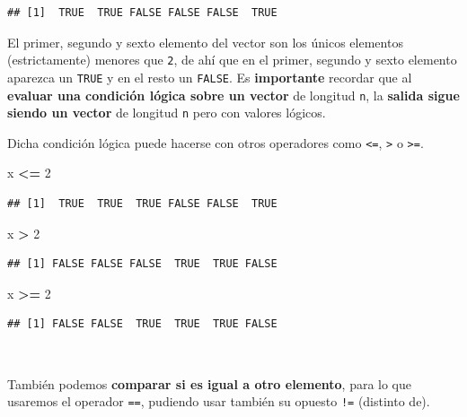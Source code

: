 \documentclass[11pt,]{book}
\newenvironment{Shaded}{\begin{snugshade}}{\end{snugshade}}
\newcommand{\DecValTok}[1]{\textcolor[rgb]{0.06,0.06,0.06}{#1}}
\newcommand{\NormalTok}[1]{#1}
\newcommand{\OperatorTok}[1]{\textcolor[rgb]{0.43,0.43,0.43}{\textbf{#1}}}
\newcommand{\StringTok}[1]{\textcolor[rgb]{0.5,0.5,0.5}{#1}}
\begin{document}
\begin{verbatim}
## [1]  TRUE  TRUE FALSE FALSE FALSE  TRUE
\end{verbatim}

El primer, segundo y sexto elemento del vector son los únicos elementos (estrictamente) menores que \texttt{2}, de ahí que en el primer, segundo y sexto elemento aparezca un \texttt{TRUE} y en el resto un \texttt{FALSE}. Es \textbf{importante} recordar que al \textbf{evaluar una condición lógica sobre un vector} de longitud \texttt{n}, la \textbf{salida sigue siendo un vector} de longitud \texttt{n} pero con valores lógicos.

Dicha condición lógica puede hacerse con otros operadores como \texttt{\textless{}=}, \texttt{\textgreater{}} o \texttt{\textgreater{}=}.

\begin{Shaded}
\begin{Highlighting}[]
\NormalTok{x }\OperatorTok{<=}\StringTok{ }\DecValTok{2}
\end{Highlighting}
\end{Shaded}

\begin{verbatim}
## [1]  TRUE  TRUE  TRUE FALSE FALSE  TRUE
\end{verbatim}

\begin{Shaded}
\begin{Highlighting}[]
\NormalTok{x }\OperatorTok{>}\StringTok{ }\DecValTok{2}
\end{Highlighting}
\end{Shaded}

\begin{verbatim}
## [1] FALSE FALSE FALSE  TRUE  TRUE FALSE
\end{verbatim}

\begin{Shaded}
\begin{Highlighting}[]
\NormalTok{x }\OperatorTok{>=}\StringTok{ }\DecValTok{2}
\end{Highlighting}
\end{Shaded}

\begin{verbatim}
## [1] FALSE FALSE  TRUE  TRUE  TRUE FALSE
\end{verbatim}

~

También podemos \textbf{comparar si es igual a otro elemento}, para lo que usaremos el operador \texttt{==}, pudiendo usar también su opuesto \texttt{!=} (distinto de).
\end{document}
